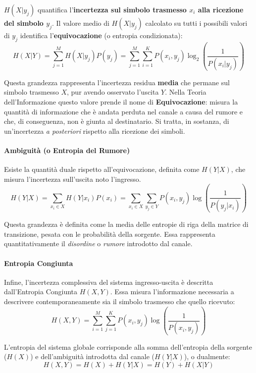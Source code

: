 $H(X|y_j)$ quantifica l'\textbf{incertezza sul simbolo trasmesso $x_i$ alla ricezione del simbolo $y_j$}. Il valore medio di $H(X|y_j)$ calcolato su tutti i possibili valori di $y_j$ identifica l'\textbf{equivocazione} (o entropia condizionata):
\[H(X|Y)=\sum_{j=1}^M H(X|y_j)P(y_j) = \sum_{j=1}^M \sum_{i=1}^K P(x_i,y_j)\log_2\left(\frac{1}{P(x_i|y_j)}\right) \]

Questa grandezza rappresenta l'incertezza residua \textbf{media} che permane sul simbolo trasmesso $X$, pur avendo osservato l'uscita $Y$. Nella Teoria dell'Informazione questo valore prende il nome di \textbf{Equivocazione}: misura la quantità di informazione che è andata perduta nel canale a causa del rumore e che, di conseguenza, non è giunta al destinatario. Si tratta, in sostanza, di un'incertezza \textit{a posteriori} rispetto alla ricezione dei simboli.

\paragraph{Ambiguità (o Entropia del Rumore)}
Esiste la quantità duale rispetto all'equivocazione, definita come $H(Y|X)$, che misura l'incertezza sull'uscita noto l'ingresso.
\[H(Y|X)=\sum_{x_i \in X}H(Y|x_i)P(x_i) = \sum_{x_i \in X}\sum_{y_j \in Y} P(x_i,y_j)\log\left(\frac{1}{P(y_j|x_i)}\right)\]

Questa grandezza è definita come la media delle entropie di riga della matrice di transizione, pesata con le probabilità della sorgente. Essa rappresenta quantitativamente il \textit{disordine} o \textit{rumore} introdotto dal canale.

\paragraph{Entropia Congiunta}
Infine, l'incertezza complessiva del sistema ingresso-uscita è descritta dall'Entropia Congiunta $H(X,Y)$. Essa misura l'informazione necessaria a descrivere contemporaneamente sia il simbolo trasmesso che quello ricevuto:
\[ H(X,Y) = \sum_{i=1}^{M} \sum_{j=1}^{K} P(x_i, y_j) \log\left(\frac{1}{P(x_i,y_j)}\right) \]

L'entropia del sistema globale corrisponde alla somma dell'entropia della sorgente ($H(X)$) e dell'ambiguità introdotta dal canale ($H(Y|X)$), o dualmente:
\[ H(X,Y) = H(X) + H(Y|X) = H(Y) + H(X|Y) \]


